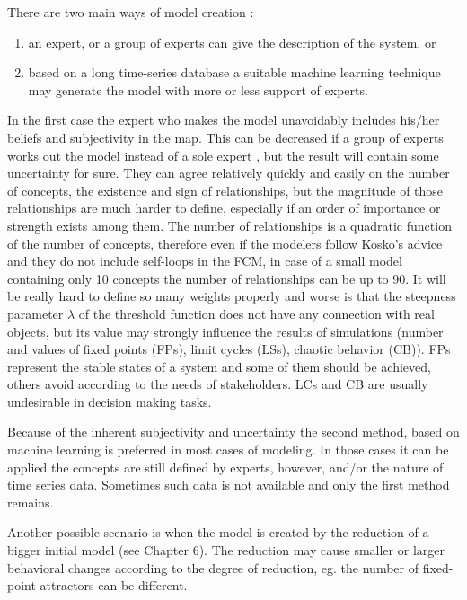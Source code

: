 \documentclass[graybox]{svmult}
\begin{document}
There are two main ways of model creation \cite{papageorgiou2012learning}:
\begin{enumerate}
  \item an expert, or a group of experts can give the description of 
  the system, or
  \item based on a long time-series database a suitable machine 
  learning technique may generate the model with more or less support 
  of experts.
\end{enumerate}

In the first case the expert who makes the model unavoidably 
includes his/her beliefs and subjectivity in the map. This can be 
decreased if a group of experts works out the model instead of a 
sole expert \cite{kosko1988hidden,groumpos2010fuzzy}, but the result 
will contain some uncertainty for sure. They can agree relatively 
quickly and easily on the number of concepts, the existence and sign 
of relationships, but the magnitude of those relationships are much 
harder to define, especially if an order of importance or strength 
exists among them. The number of relationships is a quadratic 
function of the number of concepts, therefore even if the modelers 
follow Kosko's advice and they do not include self-loops in the FCM, 
in case of a small model containing only 10 concepts the number of 
relationships can be up to 90. It will be really hard to define so 
many weights properly and worse is that the steepness parameter 
$\lambda$ of the threshold function does not have any connection 
with real objects, but its value may strongly influence the results 
of simulations (number and values of fixed points (FPs), limit cycles 
(LSs), chaotic behavior (CB)). FPs represent the stable states of a system and some of them should be achieved, others avoid according to the needs of stakeholders. LCs and CB are usually undesirable in decision making tasks.

Because of the inherent subjectivity and uncertainty the second method, based on machine learning is preferred 
in most cases of modeling. In those cases it can be applied the concepts 
are still defined by experts, however, and/or the nature of time series data. 
Sometimes such data is not available and only the first method 
remains.

Another possible scenario is when the model is created by the reduction of a bigger initial model (see Chapter 6). The reduction may cause smaller or larger behavioral changes according to the degree of reduction, eg. the number of fixed-point attractors can be different.
\end{document}
